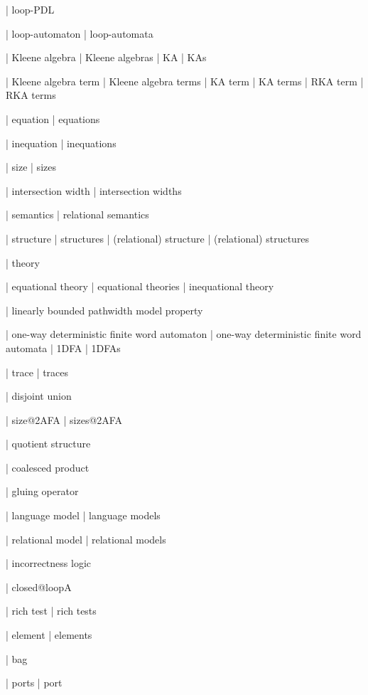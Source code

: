 | loop-PDL

| loop-automaton
| loop-automata

| Kleene algebra
| Kleene algebras
| KA
| KAs

| Kleene algebra term
| Kleene algebra terms
| KA term
| KA terms
| RKA term
| RKA terms

| equation
| equations

| inequation
| inequations

| size
| sizes

| intersection width
| intersection widths

| semantics
| relational semantics

| structure
| structures
| (relational) structure
| (relational) structures

| theory

| equational theory
| equational theories
| inequational theory

| linearly bounded pathwidth model property

| one-way deterministic finite word automaton
| one-way deterministic finite word automata
| 1DFA
| 1DFAs

| trace
| traces

| disjoint union

| size@2AFA
| sizes@2AFA

| quotient structure

| coalesced product

| gluing operator

| language model
| language models

| relational model
| relational models

| incorrectness logic

| closed@loopA

| rich test
| rich tests

| element
| elements

| bag

| ports
| port
 


